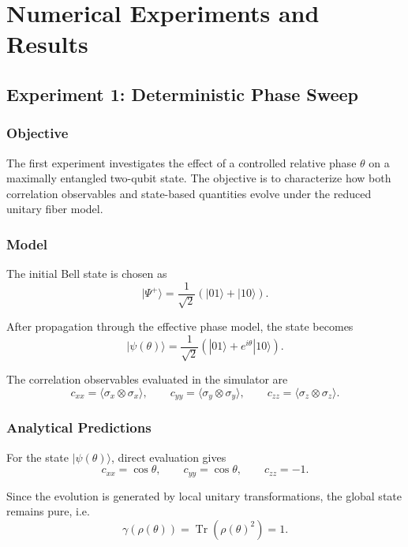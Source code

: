 \documentclass[a4paper]{article}
\begin{document}
\section{Numerical Experiments and Results}

\subsection{Experiment 1: Deterministic Phase Sweep}

\subsubsection{Objective}

The first experiment investigates the effect of a controlled relative phase \(\theta\) on a maximally entangled two-qubit state. The objective is to characterize how both correlation observables and state-based quantities evolve under the reduced unitary fiber model.

\subsubsection{Model}

The initial Bell state is chosen as
\[
|\Psi^{+}\rangle
=
\frac{1}{\sqrt{2}}
\left(
|01\rangle + |10\rangle
\right).
\]

After propagation through the effective phase model, the state becomes
\[
|\psi(\theta)\rangle
=
\frac{1}{\sqrt{2}}
\left(
|01\rangle + e^{i\theta}|10\rangle
\right).
\]

The correlation observables evaluated in the simulator are
\[
c_{xx} = \langle \sigma_x \otimes \sigma_x \rangle,\qquad
c_{yy} = \langle \sigma_y \otimes \sigma_y \rangle,\qquad
c_{zz} = \langle \sigma_z \otimes \sigma_z \rangle.
\]

\subsubsection{Analytical Predictions}

For the state \( |\psi(\theta)\rangle \), direct evaluation gives
\[
c_{xx} = \cos\theta,\qquad
c_{yy} = \cos\theta,\qquad
c_{zz} = -1.
\]

Since the evolution is generated by local unitary transformations, the global state remains pure, i.e.
\[
\gamma(\rho(\theta)) = \operatorname{Tr}(\rho(\theta)^2)=1.
\]
\end{document}
